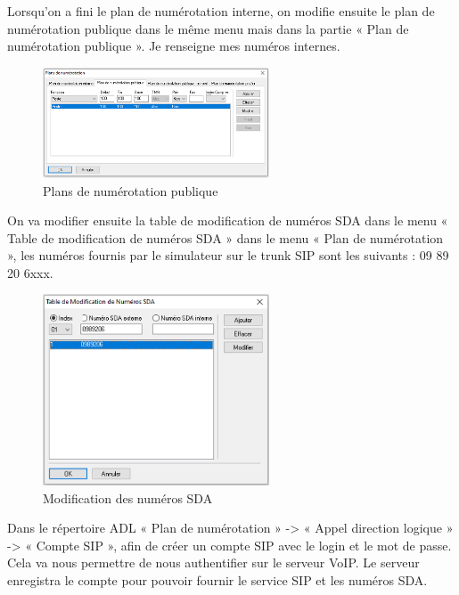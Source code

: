 \documentclass[12pt, a4paper]{article}
\begin{document}
	\newpage

	Lorsqu’on a fini le plan de numérotation interne, on modifie ensuite le plan de
	numérotation publique dans le même menu mais dans la partie « Plan de numérotation
	publique ». Je renseigne mes numéros internes.

	\begin{figure}[H]
		\centering
		\includegraphics[width=0.6\textwidth]{img/publique.png}
		\caption{Plans de numérotation publique}
		\label{fig:publique}
	\end{figure}

	On va modifier ensuite la table de modification de numéros SDA dans le menu
	« Table de modification de numéros SDA » dans le menu « Plan de numérotation »,
	les numéros fournis par le simulateur sur le trunk SIP sont les suivants : 09 89 20 6xxx.

	\begin{figure}[H]
		\centering
		\includegraphics[width=0.6\textwidth]{img/msda.png}
		\caption{Modification des numéros SDA}
		\label{fig:msda}
	\end{figure}

	\newpage

	Dans le répertoire ADL « Plan de numérotation » -> « Appel direction logique » ->
	« Compte SIP », afin de créer un compte SIP avec le login et le mot de passe.
	Cela va nous permettre de nous authentifier sur le serveur VoIP. Le serveur enregistra
	le compte pour pouvoir fournir le service SIP et les numéros SDA.
\end{document}
